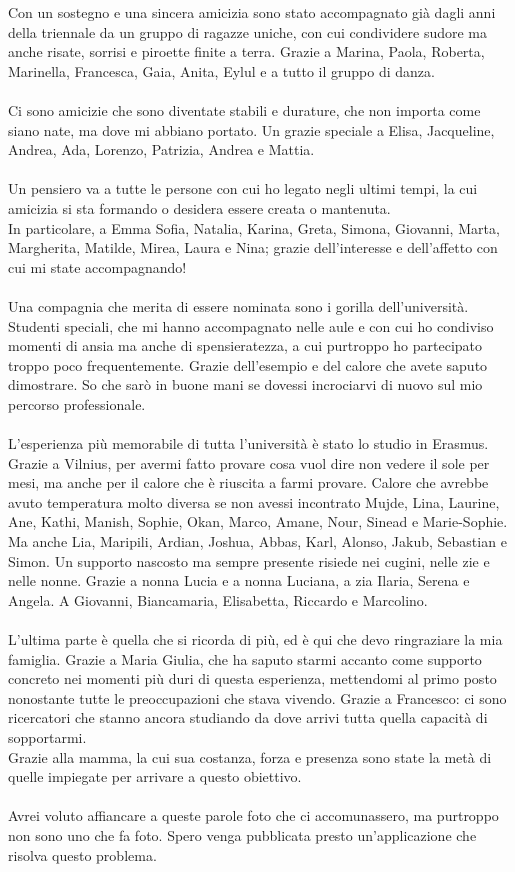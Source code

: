 Con un sostegno e una sincera amicizia
sono stato accompagnato già dagli anni della triennale
da un gruppo di ragazze uniche,
con cui condividere sudore ma anche risate,
sorrisi e piroette finite a terra.
Grazie a Marina, Paola, Roberta, Marinella,
Francesca, Gaia, Anita, Eylul e a tutto il gruppo di danza.\\
\\
Ci sono amicizie che sono diventate stabili e durature,
che non importa come siano nate, ma dove mi abbiano portato.
Un grazie speciale a Elisa, Jacqueline, Andrea, Ada, Lorenzo, Patrizia, Andrea e Mattia.\\
\\
Un pensiero va a tutte le persone con cui ho legato negli ultimi tempi,
la cui amicizia si sta formando o desidera essere creata o mantenuta.\\
In particolare, 
a Emma Sofia, Natalia, Karina, Greta, Simona, 
Giovanni, Marta, Margherita, Matilde, Mirea, Laura e Nina;
grazie dell'interesse e dell'affetto con cui mi state accompagnando!\\
\\ 
Una compagnia che merita di essere nominata sono i gorilla dell'università.
Studenti speciali, che mi hanno accompagnato nelle aule e
con cui ho condiviso momenti di ansia ma anche di spensieratezza,
a cui purtroppo ho partecipato troppo poco frequentemente.
Grazie dell'esempio e del calore che avete saputo dimostrare.
So che sarò in buone mani se dovessi incrociarvi di nuovo sul mio percorso professionale.\\
\\
L'esperienza più memorabile di tutta l'università è stato lo studio in Erasmus.
Grazie a Vilnius, per avermi fatto provare cosa vuol dire non vedere il sole per mesi,
ma anche per il calore che è riuscita a farmi provare.
Calore che avrebbe avuto temperatura molto diversa se non avessi incontrato
Mujde, Lina, Laurine, Ane, Kathi, Manish, Sophie, Okan, Marco, Amane, Nour, Sinead e Marie-Sophie.
Ma anche Lia, Maripili, Ardian, Joshua, Abbas, Karl, Alonso, Jakub, Sebastian e Simon.
\clearpage
Un supporto nascosto ma sempre presente 
risiede nei cugini, nelle zie e nelle nonne.
Grazie a nonna Lucia e a nonna Luciana,
a zia Ilaria, Serena e Angela.
A Giovanni, Biancamaria, Elisabetta, Riccardo e Marcolino.\\
\\
L'ultima parte è quella che si ricorda di più,
ed è qui che devo ringraziare la mia famiglia.
Grazie a Maria Giulia, 
che ha saputo starmi accanto come supporto concreto 
nei momenti più duri di questa esperienza,
mettendomi al primo posto nonostante tutte le preoccupazioni che stava vivendo.
Grazie a Francesco:
ci sono ricercatori che stanno ancora studiando
da dove arrivi tutta quella capacità di sopportarmi.\\
Grazie alla mamma,
la cui sua costanza, forza e presenza
sono state la metà di quelle impiegate per arrivare a questo obiettivo.\\
\\
Avrei voluto affiancare a queste parole foto che ci accomunassero,
ma purtroppo non sono uno che fa foto.
Spero venga pubblicata presto un'applicazione che risolva questo problema.
   
